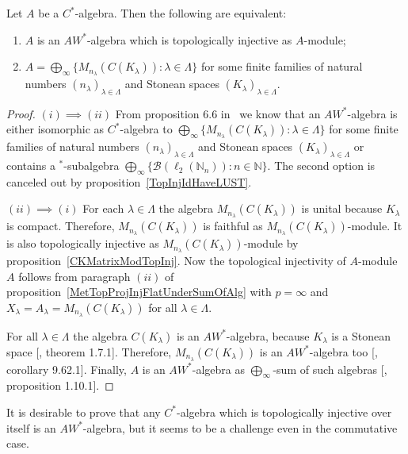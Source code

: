 \begin{theorem}\label{TopInjAWStarAlgCharac} Let $A$ be a $C^*$-algebra. Then
the following are equivalent:

\begin{enumerate}[label = (\roman*)]
    \item $A$ is an $AW^*$-algebra which is topologically injective 
    as $A$-module;

    \item $A
    =\bigoplus_\infty \{M_{n_\lambda}(C(K_\lambda)):\lambda\in\Lambda \}$
    for some finite families of natural 
    numbers ${(n_\lambda)}_{\lambda\in\Lambda}$ and Stonean 
    spaces ${(K_\lambda)}_{\lambda\in\Lambda}$.
\end{enumerate}
\end{theorem}
\begin{proof}$(i)\implies (ii)$ From proposition 6.6
in~\cite{SmithDecompPropCStarAlg} we know that an $AW^*$-algebra is either
isomorphic as $C^*$-algebra 
to  $\bigoplus_\infty \{M_{n_\lambda}(C(K_\lambda)):\lambda\in\Lambda \}$ 
for some finite families of natural numbers ${(n_\lambda)}_{\lambda\in\Lambda}$ 
and Stonean spaces ${(K_\lambda)}_{\lambda\in\Lambda}$ or contains 
a ${}^*$-subalgebra 
$\bigoplus_\infty \{ \mathcal{B}(\ell_2(\mathbb{N}_n)):n\in\mathbb{N} \}$. The
second option is canceled out by proposition~\ref{TopInjIdHaveLUST}.

$(ii)\implies (i)$ For each $\lambda\in\Lambda$ the algebra
$M_{n_\lambda}(C(K_\lambda))$ is unital because $K_\lambda$ is compact.
Therefore, $M_{n_\lambda}(C(K_\lambda))$ is faithful as
$M_{n_\lambda}(C(K_\lambda))$-module. It is also topologically injective as
$M_{n_\lambda}(C(K_\lambda))$-module by proposition~\ref{CKMatrixModTopInj}.
Now the topological injectivity of $A$-module $A$ follows from paragraph
$(ii)$ of proposition~\ref{MetTopProjInjFlatUnderSumOfAlg} with $p=\infty$ and
$X_\lambda=A_\lambda=M_{n_\lambda}(C(K_\lambda))$ for all $\lambda\in\Lambda$. 

For all $\lambda\in\Lambda$ the algebra $C(K_\lambda)$ is an $AW^*$-algebra,
because $K_\lambda$ is a Stonean space [\cite{BerbBaerStarRings}, theorem
1.7.1]. Therefore, $M_{n_\lambda}(C(K_\lambda))$ is an $AW^*$-algebra too
[\cite{BerbBaerStarRings}, corollary 9.62.1]. Finally, $A$ is an $AW^*$-algebra
as $\bigoplus_\infty$-sum of such algebras [\cite{BerbBaerStarRings},
proposition 1.10.1].
\end{proof}

It is desirable to prove that any $C^*$-algebra which is topologically injective 
over itself is an $AW^*$-algebra, but it seems to be a challenge even in the
commutative case.


